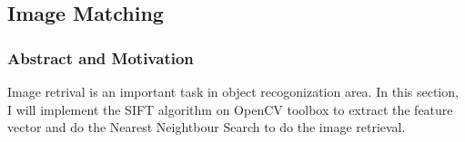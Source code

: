 \documentclass[11pt]{article}
\begin{document}





\subsection{Image Matching}
\subsubsection{Abstract and Motivation}
Image retrival is an important task in object recogonization area. In this section, I will implement the SIFT algorithm on OpenCV toolbox to extract the feature vector and do the Nearest Neightbour Search to do the image retrieval. \par
\end{document}
